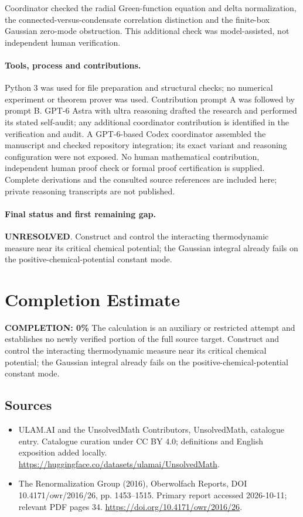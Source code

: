 \documentclass[11pt]{article}
\begin{document}
Coordinator checked the radial Green-function equation and delta normalization, the connected-versus-condensate correlation distinction and the finite-box Gaussian zero-mode obstruction. This additional check was model-assisted, not independent human verification.

\paragraph{Tools, process and contributions.}
Python 3 was used for file preparation and structural checks; no numerical experiment or theorem prover was used. Contribution prompt A was followed by prompt B. GPT-6 Astra with ultra reasoning drafted the research and performed its stated self-audit; any additional coordinator contribution is identified in the verification and audit. A GPT-6-based Codex coordinator assembled the manuscript and checked repository integration; its exact variant and reasoning configuration were not exposed. No human mathematical contribution, independent human proof check or formal proof certification is supplied. Complete derivations and the consulted source references are included here; private reasoning transcripts are not published.

\paragraph{Final status and first remaining gap.}
\textbf{UNRESOLVED}. Construct and control the interacting thermodynamic measure near its critical chemical potential; the Gaussian integral already fails on the positive-chemical-potential constant mode.

\section{Completion Estimate}
\noindent\textbf{COMPLETION: 0\%}
The calculation is an auxiliary or restricted attempt and establishes no newly verified portion of the full source target. Construct and control the interacting thermodynamic measure near its critical chemical potential; the Gaussian integral already fails on the positive-chemical-potential constant mode.

\subsection{Sources}
\begin{itemize}
\item[\hypertarget{source:statement:1}{S1}] ULAM.AI and the UnsolvedMath Contributors, UnsolvedMath, catalogue entry. Catalogue curation under CC BY 4.0; definitions and English exposition added locally.
\url{https://huggingface.co/datasets/ulamai/UnsolvedMath}.
\item[\hypertarget{source:statement:2}{S2}] The Renormalization Group (2016), Oberwolfach Reports, DOI 10.4171/owr/2016/26, pp. 1453--1515. Primary report accessed 2026-10-11; relevant PDF pages 34.
\url{https://doi.org/10.4171/owr/2016/26}.
\end{itemize}
\label{end:statement}
\end{document}

